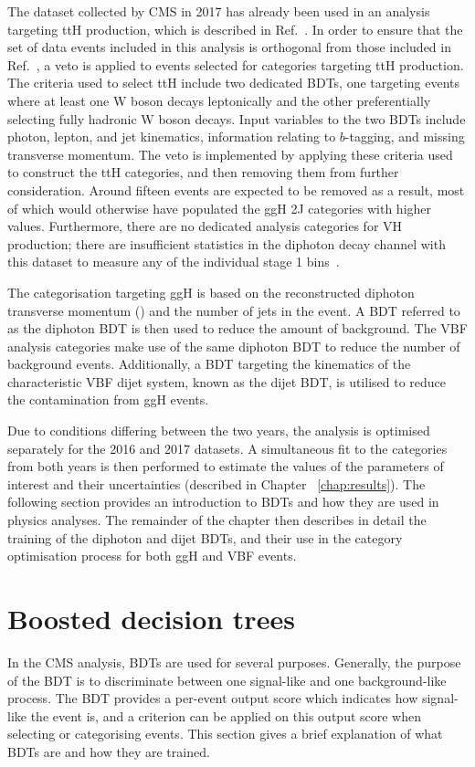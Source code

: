 The dataset collected by CMS in 2017 has already been used in an analysis targeting ttH production,
which is described in Ref.~\cite{HIG-18-018}.
In order to ensure that the set of data events included in this analysis is orthogonal 
from those included in Ref.~\cite{HIG-18-018}, 
a veto is applied to events selected for categories targeting ttH production.
The criteria used to select ttH include two dedicated BDTs, 
one targeting events where at least one W boson decays leptonically
and the other preferentially selecting fully hadronic W boson decays.
Input variables to the two BDTs include photon, lepton, and jet kinematics, 
information relating to $b$-tagging, and missing transverse momentum.
The veto is implemented by applying these criteria used to construct the ttH categories, 
and then removing them from further consideration. 
Around fifteen events are expected to be removed as a result, 
most of which would otherwise have populated the ggH 2J categories with higher \ptH values.
Furthermore, there are no dedicated analysis categories for VH production; 
there are insufficient statistics in the diphoton decay channel with this dataset 
to measure any of the individual stage 1 bins~\cite{YR4}.

The categorisation targeting ggH is based on the reconstructed diphoton transverse momentum (\ptgg) 
and the number of jets in the event. 
A BDT referred to as the diphoton BDT is then used to reduce the amount of background. 
The VBF analysis categories make use of the same diphoton BDT 
to reduce the number of background events. 
Additionally, a BDT targeting the kinematics of the characteristic VBF dijet system, 
known as the dijet BDT, is utilised to reduce the contamination from ggH events.

Due to conditions differing between the two years, 
the analysis is optimised separately for the 2016 and 2017 datasets. 
A simultaneous fit to the categories from both years is then performed to estimate the 
values of the parameters of interest and their uncertainties (described in Chapter ~\ref{chap:results}).
The following section provides an introduction to BDTs and how they are used in physics analyses.
The remainder of the chapter then describes in detail the training of the diphoton and dijet BDTs, 
and their use in the category optimisation process for both ggH and VBF events.

\section{Boosted decision trees}
\label{sec:BDTs}
In the CMS \Hgg analysis, BDTs are used for several purposes.
Generally, the purpose of the BDT is to discriminate between 
one signal-like and one background-like process.
The BDT provides a per-event output score which indicates how signal-like the event is, 
and a criterion can be applied on this output score when selecting or categorising events.
This section gives a brief explanation of what BDTs are and how they are trained.

